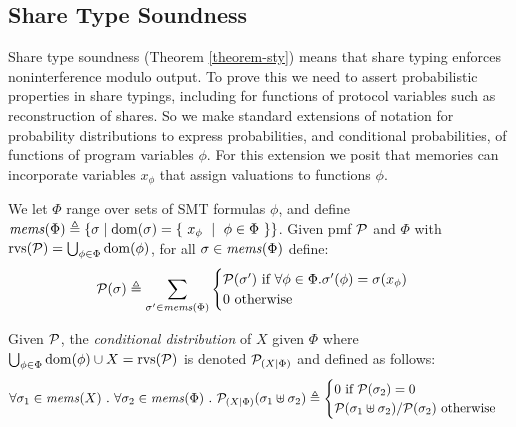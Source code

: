 \subsection{Share Type Soundness}
\label{section-sty-sound}

Share type soundness (Theorem \ref{theorem-sty}) means that share
typing enforces noninterference modulo output. To prove this we need
to assert probabilistic properties in share typings, including for
functions of protocol variables such as reconstruction of shares. So
we make standard extensions of notation for probability distributions
to express probabilities, and conditional probabilities, of functions
of program variables $\phi$. For this extension we posit that
memories can incorporate variables $x_\phi$ that assign valuations
to functions $\phi$.
\begin{definition}
  We let $\Phi$ range over sets of SMT formulas $\phi$, and define
  $
  \mathit{mems}(\Phi) \triangleq \{ \sigma \mid \mathrm{dom}(\sigma) = \{ \ x_{\phi}\ \mid\ \phi \in \Phi\  \} \}
  $.
  Given pmf $\mathcal{P}$ and $\Phi$ with $\mathrm{rvs}(\mathcal{P}) = \bigcup_{\phi \in \Phi} \mathrm{dom}(\phi)$,
  for all $\sigma \in \mathit{mems}(\Phi)$ define:
  $$
  \mathcal{P}(\sigma) \triangleq \sum_{\sigma' \in \mathit{mems}(\Phi)}
  \begin{cases}
    \mathcal{P}(\sigma') \ \text{if}\ \forall \phi \in \Phi . \sigma'(\phi) = \sigma(x_\phi)  \\
    0 \ \text{otherwise}
  \end{cases}
  $$
\end{definition}

\begin{definition}
  Given $\mathcal{P}$, the \emph{conditional distribution}
  of $X$ given $\Phi$ where $\bigcup_{\phi \in \Phi} \mathrm{dom}(\phi) \cup X = \mathrm{rvs}(\mathcal{P})$ 
  is denoted $\mathcal{P}_{({X}|{\Phi})}$ and defined as follows: 
  $$
  \forall \store_1 \in \mems(X)\ .\ \forall \store_2 \in \mems(\Phi) \ .\ 
  \condd{\pmf}{X}{\Phi}(\store_1 \uplus \store_2) \defeq
  \begin{cases}
    0 \text{\ if\ } \pmf(\store_2) = 0\\
    \pmf(\store_1 \uplus \store_2) / \pmf(\store_2) \text{\ otherwise}
  \end{cases}
  $$
\end{definition}

